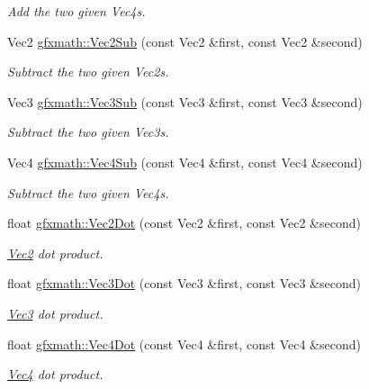 \begin{DoxyCompactItemize}
\begin{DoxyCompactList}\small\item\em Add the two given Vec4s. \end{DoxyCompactList}\item 
Vec2 \hyperlink{group___s_i_s_d_vec_math_gabc910528ba2f4f4c3b69bf432e5c7731}{gfxmath\+::\+Vec2\+Sub} (const Vec2 \&first, const Vec2 \&second)
\begin{DoxyCompactList}\small\item\em Subtract the two given Vec2s. \end{DoxyCompactList}\item 
Vec3 \hyperlink{group___s_i_s_d_vec_math_gae7189108aa879fb16ce9afd17052ac16}{gfxmath\+::\+Vec3\+Sub} (const Vec3 \&first, const Vec3 \&second)
\begin{DoxyCompactList}\small\item\em Subtract the two given Vec3s. \end{DoxyCompactList}\item 
Vec4 \hyperlink{group___s_i_s_d_vec_math_ga01968b83532d01613a8f89659d4a52dc}{gfxmath\+::\+Vec4\+Sub} (const Vec4 \&first, const Vec4 \&second)
\begin{DoxyCompactList}\small\item\em Subtract the two given Vec4s. \end{DoxyCompactList}\item 
float \hyperlink{group___s_i_s_d_vec_math_gaf722c71a1e9ef7bf97d9489b1cf561e0}{gfxmath\+::\+Vec2\+Dot} (const Vec2 \&first, const Vec2 \&second)
\begin{DoxyCompactList}\small\item\em \hyperlink{classgfxmath_1_1_vec2}{Vec2} dot product. \end{DoxyCompactList}\item 
float \hyperlink{group___s_i_s_d_vec_math_ga02eb26d5238095f747d35890a597e489}{gfxmath\+::\+Vec3\+Dot} (const Vec3 \&first, const Vec3 \&second)
\begin{DoxyCompactList}\small\item\em \hyperlink{classgfxmath_1_1_vec3}{Vec3} dot product. \end{DoxyCompactList}\item 
float \hyperlink{group___s_i_s_d_vec_math_ga2deb01c8dd6f1a06c0a0cfc2e96e9c1e}{gfxmath\+::\+Vec4\+Dot} (const Vec4 \&first, const Vec4 \&second)
\begin{DoxyCompactList}\small\item\em \hyperlink{classgfxmath_1_1_vec4}{Vec4} dot product. \end{DoxyCompactList}\item 

\end{DoxyCompactItemize}
